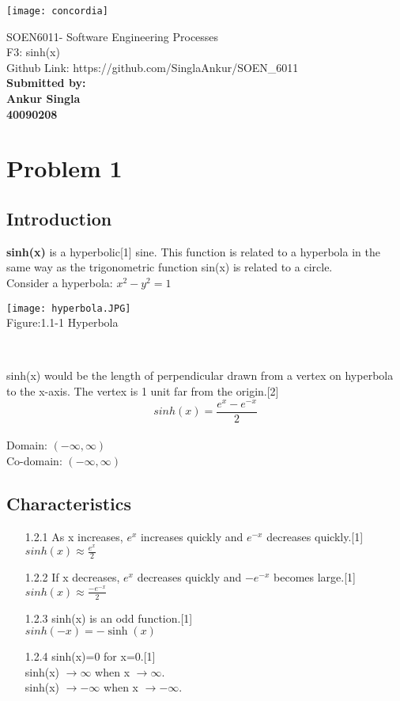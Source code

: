 \documentclass{article}
\begin{document}
\texttt{[image: concordia]}
\begin{small}
\Large SOEN6011- Software Engineering Processes\\
\linebreak
{F3: sinh(x)}\\
Github Link: https://github.com/SinglaAnkur/SOEN\_6011
\vspace{110mm}\\
\textbf{Submitted by:}\\
\textbf{Ankur Singla}\\
\textbf{40090208}\\
\end{small}
\newpage
\tableofcontents
\newpage
\section{Problem 1}
\subsection{Introduction}
\textbf{sinh(x)} is a hyperbolic[1] sine. This function is related to a hyperbola in the same way as the trigonometric function sin(x) is related to a circle.\\
Consider a hyperbola:  $x^2-y^2=1$\\

\begin{center}
\texttt{[image: hyperbola.JPG]}\\
\caption{Figure:1.1-1 Hyperbola}\\
\end{center}
\begin{small}
sinh(x) would be the length of perpendicular drawn from a vertex on hyperbola to the x-axis. The vertex is 1 unit far from the origin.[2]\\
\[sinh(x)=\frac {e^x-e^{-x}}{2}\]\\
Domain: $(-\infty,\infty)$\\
Co-domain: $(-\infty,\infty)$\\
\end{small}

\subsection{ Characteristics}
\begin{itemize}
\item [1.2.1]As x increases, $e^x$ increases quickly and $e^{−x}$ decreases quickly.[1]\\
$sinh(x) \approx \frac{e^x}{2}$
\item [1.2.2]If x decreases, $e^x$ decreases quickly and $-e^{−x}$ becomes large.[1]\\
$sinh(x) \approx \frac{- e^{-x}}{2}$
\item [1.2.3]sinh(x) is an odd function.[1]\\
$sinh(−x) = −\sinh(x)$
\item [1.2.4]sinh(x)=0 for x=0.[1]\\ sinh(x) $\to \infty$ when x $\to \infty$.\\ sinh(x) $\to -\infty$ when x $\to -\infty$.
\end{itemize}
\end{document}

